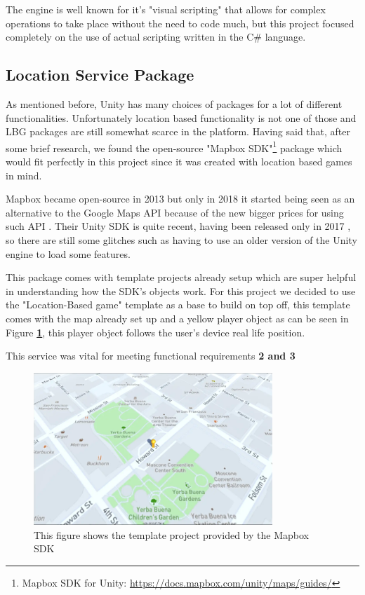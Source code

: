 \documentclass{dissertation}
\begin{document}
The engine is well known for it's "visual scripting" that allows for complex operations to take place without the need to code much, but this project focused completely on the use of actual scripting written in the C\# language.

\subsection{Location Service Package}
As mentioned before, Unity has many choices of packages for a lot of different functionalities. Unfortunately location based functionality is not one of those and LBG packages are still somewhat scarce in the platform. Having said that, after some brief research, we found the open-source "Mapbox SDK"\footnote{Mapbox SDK for Unity: \url{https://docs.mapbox.com/unity/maps/guides/}} package which would fit perfectly in this project since it was created with location based games in mind. 

Mapbox became open-source in 2013 but only in 2018 it started being seen as an alternative to the Google Maps API because of the new bigger prices for using such API \citep{Bulatovych19}. Their Unity SDK is quite recent, having been released only in 2017 \citep{Mapbox21}, so there are still some glitches such as having to use an older version of the Unity engine to load some features. 

This package comes with template projects already setup which are super helpful in understanding how the SDK's objects work. For this project we decided to use the "Location-Based game" template as a base to build on top off, this template comes with the map already set up and a yellow player object as can be seen in Figure \textbf{\ref{fig:mapbox-unity}}, this player object follows the user's device real life position.

This service was vital for meeting functional requirements \textbf{2 and 3}

\begin{figure}[H]
\centering
\includegraphics[width = 9cm]{images/mapbox-unity.png}
\caption{This figure shows the template project provided by the Mapbox SDK}
\label{fig:mapbox-unity}
\end{figure}
\end{document}
